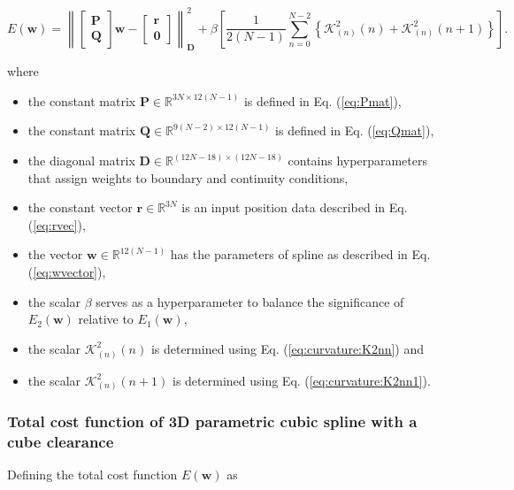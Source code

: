 \begin{equation}
E(\mathbf{w})
=
\left\|
\begin{bmatrix}
\mathbf{P}\\
\mathbf{Q}
\end{bmatrix}
\mathbf{w}
-
\begin{bmatrix}
\mathbf{r}\\
\mathbf{0}
\end{bmatrix}
\right\|_{\mathbf{D}}^{2}
+\beta 
\left[
\frac{1}{2(N-1)}
\sum\limits_{n=0}^{N-2}
\left\{
\mathcal{K}_{(n)}^{2}(n)
+
\mathcal{K}_{(n)}^{2}(n+1)
\right\}
\right].
\end{equation}

where 
\begin{itemize}
\item the constant matrix $\mathbf{P} \in \mathbb{R}^{3N\times 12(N-1)}$ is defined in Eq. (\ref{eq:Pmat}),
\item the constant matrix $\mathbf{Q} \in \mathbb{R}^{9(N-2)\times 12(N-1)}$ is defined in Eq. (\ref{eq:Qmat}),
\item the diagonal matrix $\mathbf{D} \in \mathbb{R}^{(12N-18)\times (12N-18)}$ contains hyperparameters that assign weights to boundary and continuity conditions,
\item the constant vector $\mathbf{r} \in \mathbb{R}^{3N}$ is an input position data described in Eq. (\ref{eq:rvec}),
\item the vector $\mathbf{w} \in \mathbb{R}^{12(N-1)}$ has the parameters of spline as described in Eq. (\ref{eq:wvector}),
\item the scalar $\beta$ serves as a hyperparameter to balance the significance of $E_{2}(\mathbf{w})$ relative to $E_{1}(\mathbf{w})$,
\item the scalar $\mathcal{K}_{(n)}^{2}(n)$ is determined using Eq. (\ref{eq:curvature:K2nn}) and 
\item the scalar $\mathcal{K}_{(n)}^{2}(n+1)$ is determined using Eq. (\ref{eq:curvature:K2nn1}).
\end{itemize}

\subsubsection{Total cost function of 3D parametric cubic spline with a cube clearance}
\label{sec:TotalCostFuncCube}

Defining the total cost function $E(\mathbf{w})$ as


